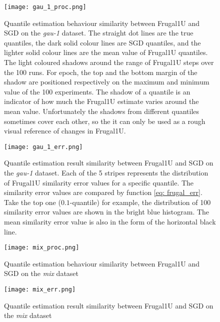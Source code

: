 \begin{figure}[h!]
    \centering
    \texttt{[image: gau\_1\_proc.png]}
    \caption{Quantile estimation behaviour similarity between Frugal1U and SGD on the \textit{gau-1} dataset. The straight dot lines are the true quantiles, the dark solid colour lines are SGD quantiles, and the lighter solid colour lines are the mean value of Frugal1U quantiles. The light coloured shadows around the range of Frugal1U steps over the 100 runs. For epoch, the top and the bottom margin of the shadow are positioned respectively on the maximum and minimum value of the 100 experiments. The shadow of a quantile is an indicator of how much the Frugal1U estimate varies around the mean value. Unfortunately the shadows from different quantiles sometimes cover each other, so the it can only be used as a rough visual reference of changes in Frugal1U.}
    \label{fig: gau_1_proc_explanation}
\end{figure}


\begin{figure}[h!]
    \centering
	\texttt{[image: gau\_1\_err.png]}
    \caption{Quantile estimation result similarity between Frugal1U and SGD on the \textit{gau-1} dataset.
    Each of the 5 stripes represents the distribution of Frugal1U similarity error values for a specific quantile. The similarity error values are compared by function \eqref{eq: frugal_err}. Take the top one ($0.1$-quantile) for example, the distribution of 100 similarity error values are shown in the bright blue histogram. The mean similarity error value is also in the form of the horizontal black line.}
    \label{fig: gau_1_err_explanation}
\end{figure}

\begin{figure}[h!]
    \centering
	\texttt{[image: mix\_proc.png]}
    \caption{Quantile estimation behaviour similarity between Frugal1U and SGD on the \textit{mix} dataset}
    \label{fig: mix_proc}
\end{figure}

\begin{figure}[h!]
    \centering
	\texttt{[image: mix\_err.png]}
    \caption{Quantile estimation result similarity between Frugal1U and SGD on the \textit{mix} dataset}
    \label{fig: mix_err}
\end{figure}

